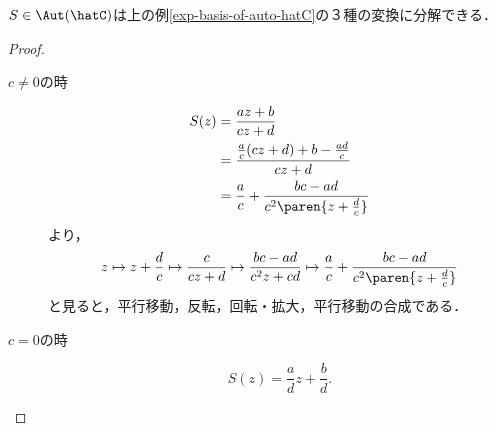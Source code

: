 \documentclass[uplatex, dvipdfmx]{jsreport}
\begin{document}
\begin{proposition}[Möbius変換の標準分解]
    $S\in\Aut(\hatC)$は上の例\ref{exp-basis-of-auto-hatC}の３種の変換に分解できる．
\end{proposition}
\begin{proof}\mbox{}
    \begin{description}
        \item[$c\ne 0$の時] 
        \begin{align*}
            S(z)&=\frac{az+b}{cz+d}\\
            &=\frac{\frac{a}{c}(cz+d)+b-\frac{ad}{c}}{cz+d}\\
            &=\frac{a}{c}+\frac{bc-ad}{c^2\paren{z+\frac{d}{c}}}
        \end{align*}
        より，
        \[z\mapsto z+\frac{d}{c}\mapsto\frac{c}{cz+d}\mapsto\frac{bc-ad}{c^2z+cd}\mapsto\frac{a}{c}+\frac{bc-ad}{c^2\paren{z+\frac{d}{c}}}\]
        と見ると，平行移動，反転，回転・拡大，平行移動の合成である．
        \item[$c=0$の時]
        \[S(z)=\frac{a}{d}z+\frac{b}{d}.\]
    \end{description}
\end{proof}
\end{document}
